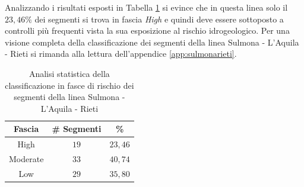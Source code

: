 \newline
Analizzando i risultati esposti in Tabella \ref{percentualesulmonarieti} si evince che in questa linea solo il $23,46\%$ dei segmenti si trova in fascia \textit{High} e quindi deve essere sottoposto a controlli più frequenti vista la sua esposizione al rischio idrogeologico. Per una visione completa della classificazione dei segmenti della linea Sulmona - L'Aquila - Rieti si rimanda alla lettura dell'appendice \ref{app:sulmonarieti}.
\begin{table}[h]
\centering
\begin{tabular}{|c|c|c|}
\hline \rowcolor{lightgray}
Fascia   & \# Segmenti & \%    \\ \hline \rowcolor{flamingopink}
High     & $19$           & $23,46$     \\ \hline \rowcolor{icterine}
Moderate & $33$          & $40,74$ \\ \hline \rowcolor{inchworm}
Low      & $29$          & $35,80$ \\ \hline
\end{tabular}
\caption{Analisi statistica della classificazione in fasce di rischio dei segmenti della linea Sulmona - L'Aquila - Rieti}
\label{percentualesulmonarieti}
\end{table}
\newpage
